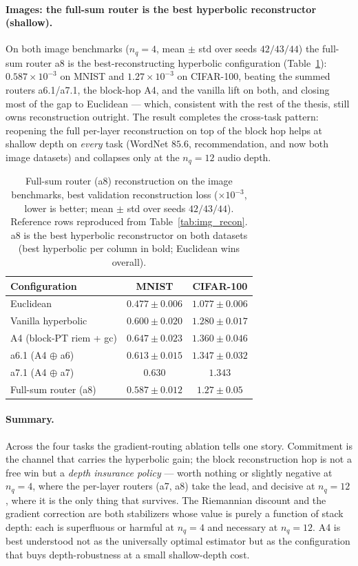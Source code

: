 \documentclass[12pt]{report}
\begin{document}
\paragraph{Images: the full-sum router is the best hyperbolic reconstructor (shallow).} On both image benchmarks ($n_q=4$, mean $\pm$ std over seeds $42/43/44$) the full-sum router a8 is the best-reconstructing hyperbolic configuration (Table~\ref{tab:abl_image}): $0.587\times10^{-3}$ on MNIST and $1.27\times10^{-3}$ on CIFAR-100, beating the summed routers a6.1/a7.1, the block-hop A4, and the vanilla lift on both, and closing most of the gap to Euclidean --- which, consistent with the rest of the thesis, still owns reconstruction outright. The result completes the cross-task pattern: reopening the full per-layer reconstruction on top of the block hop helps at shallow depth on \emph{every} task (WordNet $85.6$, recommendation, and now both image datasets) and collapses only at the $n_q=12$ audio depth.

\begin{table}[h]
\centering
\caption{Full-sum router (a8) reconstruction on the image benchmarks, best validation reconstruction loss ($\times10^{-3}$, lower is better; mean $\pm$ std over seeds $42/43/44$). Reference rows reproduced from Table~\ref{tab:img_recon}. a8 is the best hyperbolic reconstructor on both datasets (best hyperbolic per column in bold; Euclidean wins overall).}
\label{tab:abl_image}
\begin{tabular}{lcc}
\hline
Configuration & MNIST & CIFAR-100 \\
\hline
Euclidean & $0.477 \pm 0.006$ & $1.077 \pm 0.006$ \\
Vanilla hyperbolic & $0.600 \pm 0.020$ & $1.280 \pm 0.017$ \\
A4 (block-PT riem + gc) & $0.647 \pm 0.023$ & $1.360 \pm 0.046$ \\
a6.1 (A4 $\oplus$ a6) & $0.613 \pm 0.015$ & $1.347 \pm 0.032$ \\
a7.1 (A4 $\oplus$ a7) & $0.630$ & $1.343$ \\
Full-sum router (a8) & $\mathbf{0.587 \pm 0.012}$ & $\mathbf{1.27 \pm 0.05}$ \\
\hline
\end{tabular}
\end{table}

\paragraph{Summary.} Across the four tasks the gradient-routing ablation tells one story. Commitment is the channel that carries the hyperbolic gain; the block reconstruction hop is not a free win but a \emph{depth insurance policy} --- worth nothing or slightly negative at $n_q=4$, where the per-layer routers (a7, a8) take the lead, and decisive at $n_q=12$, where it is the only thing that survives. The Riemannian discount and the gradient correction are both stabilizers whose value is purely a function of stack depth: each is superfluous or harmful at $n_q=4$ and necessary at $n_q=12$. A4 is best understood not as the universally optimal estimator but as the configuration that buys depth-robustness at a small shallow-depth cost.
\end{document}
